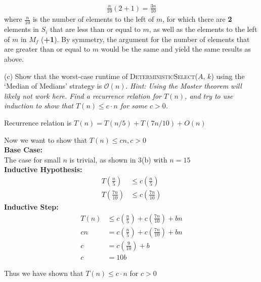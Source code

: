 \documentclass[11pt]{article}
\begin{document}
\begin{subparts}
\begin{solution}
            \begin{align*}
                \frac{n}{10}(2 + 1) = \frac{3n}{10}
            \end{align*}
            where \textbf{$\frac{n}{10}$} is the number of elements to the left of $m$, for which there are \textbf{2} elements in  $S_i$ that are less than or equal to $m$, 
            as well as the elements to the left of $m$ in $M_f$ (\textbf{+1}). By symmetry, the argument for the number of elements that are greater than or equal to $m$ would be the same and yield the same results as above.
        \end{solution}
    \newpage
    \item[(c)] Show that the worst-case runtime of \textsc{DeterministicSelect}($A$, $k$) using the `Median of Medians' strategy is $\mathcal{O}(n)$.
    \textit{Hint: Using the Master theorem will likely not work here. 
    Find a recurrence relation for $T(n)$, and try to use induction to show that $T(n) \leq c \cdot n$ for some $c > 0$.}\\
    \begin{solution}
        Recurrence relation is $T(n) = T(n/5) + T(7n/10) + O(n)$
        \begin{center}
            Now we want to show that $T(n) \le cn, c>0$\\
            \textbf{Base Case: }\\
            The case for small $n$ is trivial, as shown in 3(b) with $n=15$\\
            \textbf{Inductive Hypothesis: }
            \begin{align*}
                T\left(\frac{n}{5}\right) &\le c\left(\frac{n}{5}\right)\\
                T\left(\frac{7n}{10}\right) &\le c\left(\frac{7n}{10}\right)
            \end{align*}
            \textbf{Inductive Step: }
            \begin{align*}
                T(n) &\le c \left(\frac{n}{5}\right) + c\left(\frac{7n}{10}\right) + bn\\
                cn &= c\left(\frac{n}{5}\right) + c\left(\frac{7n}{10}\right) + bn\\
                c &= c\left(\frac{9}{10}\right) + b\\
                c &= 10b
            \end{align*}
        \end{center}
        Thus we have shown that $T(n) \le c\cdot n$ for $c > 0$
    \end{solution}

\end{subparts}
\end{document}
